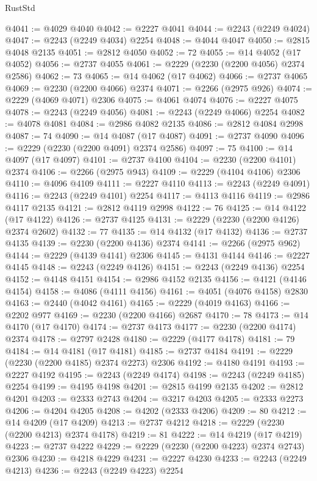 \begin{lexlean}{RustStd}
\begin{coremodule}
@4041 := @4029 @4040
@4042 := @2227 @4041
@4044 := @2243 (@2249 @4024)
@4047 := @2243 (@2249 @4034) @2254
@4048 := @4044 @4047
@4050 := @2815 @4048 @2135
@4051 := @2812 @4050
@4052 := 72
@4055 := @14 @4052 (@17 @4052)
@4056 := @2737 @4055
@4061 := @2229 (@2230 (@2200 @4056) @2374 @2586)
@4062 := 73
@4065 := @14 @4062 (@17 @4062)
@4066 := @2737 @4065
@4069 := @2230 (@2200 @4066) @2374
@4071 := @2266 (@2975 @926)
@4074 := @2229 (@4069 @4071) @2306
@4075 := @4061 @4074
@4076 := @2227 @4075
@4078 := @2243 (@2249 @4056)
@4081 := @2243 (@2249 @4066) @2254
@4082 := @4078 @4081
@4084 := @2986 @4082 @2135
@4086 := @2812 @4084 @2998
@4087 := 74
@4090 := @14 @4087 (@17 @4087)
@4091 := @2737 @4090
@4096 := @2229 (@2230 (@2200 @4091) @2374 @2586)
@4097 := 75
@4100 := @14 @4097 (@17 @4097)
@4101 := @2737 @4100
@4104 := @2230 (@2200 @4101) @2374
@4106 := @2266 (@2975 @943)
@4109 := @2229 (@4104 @4106) @2306
@4110 := @4096 @4109
@4111 := @2227 @4110
@4113 := @2243 (@2249 @4091)
@4116 := @2243 (@2249 @4101) @2254
@4117 := @4113 @4116
@4119 := @2986 @4117 @2135
@4121 := @2812 @4119 @2998
@4122 := 76
@4125 := @14 @4122 (@17 @4122)
@4126 := @2737 @4125
@4131 := @2229 (@2230 (@2200 @4126) @2374 @2602)
@4132 := 77
@4135 := @14 @4132 (@17 @4132)
@4136 := @2737 @4135
@4139 := @2230 (@2200 @4136) @2374
@4141 := @2266 (@2975 @962)
@4144 := @2229 (@4139 @4141) @2306
@4145 := @4131 @4144
@4146 := @2227 @4145
@4148 := @2243 (@2249 @4126)
@4151 := @2243 (@2249 @4136) @2254
@4152 := @4148 @4151
@4154 := @2986 @4152 @2135
@4156 := @4121 (@4146 @4154)
@4158 := @4086 (@4111 @4156)
@4161 := @4051 (@4076 @4158) @2830
@4163 := @2440 (@4042 @4161)
@4165 := @2229 (@4019 @4163)
@4166 := @2202 @977
@4169 := @2230 (@2200 @4166) @2687
@4170 := 78
@4173 := @14 @4170 (@17 @4170)
@4174 := @2737 @4173
@4177 := @2230 (@2200 @4174) @2374
@4178 := @2797 @2428
@4180 := @2229 (@4177 @4178)
@4181 := 79
@4184 := @14 @4181 (@17 @4181)
@4185 := @2737 @4184
@4191 := @2229 (@2230 (@2200 @4185) @2374 @2273) @2306
@4192 := @4180 @4191
@4193 := @2227 @4192
@4195 := @2243 (@2249 @4174)
@4198 := @2243 (@2249 @4185) @2254
@4199 := @4195 @4198
@4201 := @2815 @4199 @2135
@4202 := @2812 @4201
@4203 := @2333 @2743
@4204 := @3217 @4203
@4205 := @2333 @2273
@4206 := @4204 @4205
@4208 := @4202 (@2333 @4206)
@4209 := 80
@4212 := @14 @4209 (@17 @4209)
@4213 := @2737 @4212
@4218 := @2229 (@2230 (@2200 @4213) @2374 @4178)
@4219 := 81
@4222 := @14 @4219 (@17 @4219)
@4223 := @2737 @4222
@4229 := @2229 (@2230 (@2200 @4223) @2374 @2743) @2306
@4230 := @4218 @4229
@4231 := @2227 @4230
@4233 := @2243 (@2249 @4213)
@4236 := @2243 (@2249 @4223) @2254

\end{coremodule}
\end{lexlean}
